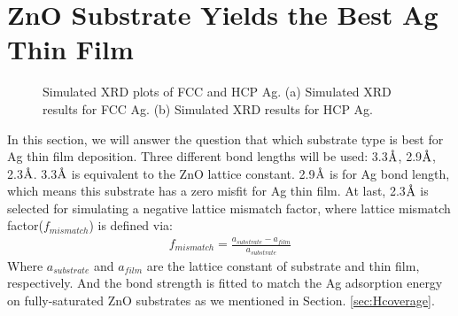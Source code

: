 \section{ZnO Substrate Yields the Best Ag Thin Film}

\begingroup
\begin{figure}[ht]
  \centering
  \label{Chap:Ag/ZnO:fig:4a}
  \label{Chap:Ag/ZnO:fig:4b}
\caption[Simulated XRD plots of FCC and HCP Ag]{Simulated XRD plots of FCC and HCP Ag. (a) Simulated XRD results for FCC Ag. (b) Simulated XRD results for HCP Ag.}
  \label{Chap:Ag/ZnO:fig4}
\end{figure}
\endgroup

In this section, we will answer the question that which substrate type is best for Ag thin film deposition. Three different bond lengths will be used: 3.3$\mbox{\normalfont\AA}$, 2.9$\mbox{\normalfont\AA}$, 2.3$\mbox{\normalfont\AA}$. 3.3$\mbox{\normalfont\AA}$ is equivalent to the ZnO lattice constant. 2.9$\mbox{\normalfont\AA}$ is for Ag bond length, which means this substrate has a zero misfit for Ag thin film. At last, 2.3$\mbox{\normalfont\AA}$ is selected for simulating a negative lattice mismatch factor, where lattice mismatch factor($f_{mismatch}$) is defined via:
\begin{align}
    f_{mismatch} = \frac{a_{substrate} - a_{film}}{a_{substrate}}
    \label{Chap:Ag/ZnO:eq:mismatch}
\end{align}
Where $a_{substrate}$ and $a_{film}$ are the lattice constant of substrate and thin film, respectively. And the bond strength is fitted to match the Ag adsorption energy on fully-saturated ZnO substrates as we mentioned in Section. \ref{sec:Hcoverage}.

